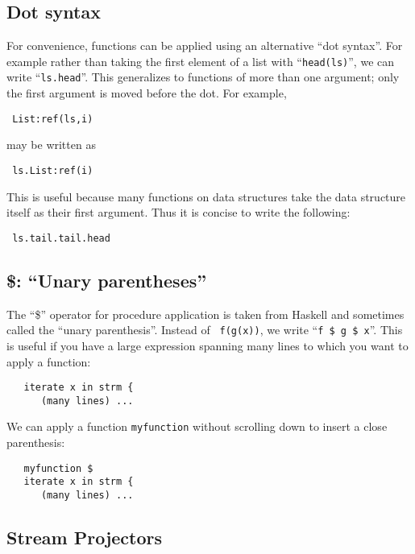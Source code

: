 \documentclass[twocolumn]{report}
\newcommand{\cde}{\tt}
\newenvironment{wscode}{\begin{center}\tt}{\end{center}}
\begin{document}
\subsection{Dot syntax}
  For convenience, functions can be applied using an
alternative ``dot syntax''.  For example rather than taking the first
element of a list with ``{\cde head(ls)}'', we can write ``{\cde ls.head}''.
This generalizes to functions of more than one argument; only the
first argument is moved before the dot.  For example, 
\vspace{-2mm}
\begin{wscode}
List:ref(ls,i)
\end{wscode}
\vspace{-2mm}
 may be written as 
\vspace{-2mm}
\begin{wscode}
ls.List:ref(i)
\end{wscode}
\vspace{-2mm}
This is useful because many functions on data structures take the
data structure itself as their first argument.  Thus it is concise to
write the following:
\vspace{-2mm}
\begin{wscode}
ls.tail.tail.head
\end{wscode}
\vspace{-2mm}


\subsection{\$: ``Unary parentheses''}

The ``\$'' operator for procedure application is taken from Haskell
and sometimes called the ``unary parenthesis''.  Instead of {\cde
  f(g(x))}, we write ``{\cde f \$ g \$ x}''.
This is useful if you have a large expression spanning many lines to
which you want to apply a function:
\begin{verbatim}
   iterate x in strm { 
      (many lines) ... 
\end{verbatim}
We can apply a function {\cde myfunction} without scrolling down to
insert a close parenthesis:
\begin{verbatim}
   myfunction $
   iterate x in strm { 
      (many lines) ... 
\end{verbatim}

\subsection{Stream Projectors}
\end{document}
